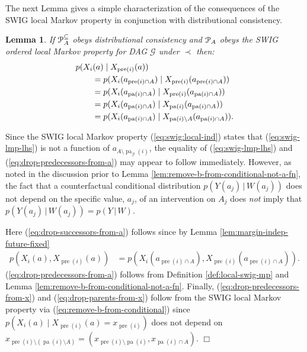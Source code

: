 \documentclass[11pt]{article}
\DeclareMathOperator{\pa}{pa}
\DeclareMathOperator{\pre}{pre}
\newtheorem{lemma}[theorem]{Lemma}
\newcommand{\G}{{\mathscr G}}
\begin{document}
{The next Lemma gives a simple characterization of the consequences of the SWIG local Markov property in conjunction with distributional consistency.

\begin{lemma}\label{lem:kernel-of-swig-lmp}
 If ${\cal P}^{\subseteq}_A$ obeys distributional consistency and ${\cal P}_A$  obeys the 
SWIG ordered local Markov property for DAG $\G$ under $\prec$ then:
\begin{align}
\MoveEqLeft{p(X_i({ a}) \mid X_{\pre(i)}({ a}) )}\label{eq:swig-lmp-lhs}\\
&= p(X_i({ a}_{\pre(i)\cap A}) \mid X_{\pre(i)}({ a}_{\pre(i)\cap A}) ) \label{eq:drop-successors-from-a}  \\
&= p(X_i({ a}_{\pa(i)\cap A}) \mid X_{\pre(i)}({ a}_{\pa(i)\cap A}) ) \label{eq:drop-predecessors-from-a} \\
&= p(X_i({ a}_{\pa(i)\cap A}) \mid X_{\pa(i)}({ a}_{\pa(i)\cap A}) ) \label{eq:drop-predecessors-from-x} \\
&= p(X_i({ a}_{\pa(i)\cap A}) \mid X_{\pa(i)\setminus A}({ a}_{\pa(i)\cap A}) ). \label{eq:drop-parents-from-x} 
\end{align}
\end{lemma}


Since  the SWIG local Markov property (\ref{eq:swig:local-ind}) states that (\ref{eq:swig-lmp-lhs}) is not a function of
$a_{A \setminus \pa_{\G}(i)}$, the
equality of (\ref{eq:swig-lmp-lhs}) and (\ref{eq:drop-predecessors-from-a}) 
may appear to follow immediately.
However, as noted in the discussion prior to Lemma \ref{lem:remove-b-from-conditional-not-a-fn}, the fact that a counterfactual conditional distribution $p(Y(a_j)\,|\,W(a_j))$ does not depend on the specific value, $a_j$, of an intervention on $A_j$ does {\em not} imply that
$p(Y(a_j)\,|\,W(a_j)) = p(Y\,|\,W)$.
\medskip

 Here (\ref{eq:drop-successors-from-a}) follows since by Lemma \ref{lem:margin-indep-future-fixed}
\begin{align*}
p(X_i({ a}), X_{\pre(i)}({ a}) ) 
&= p(X_i({ a}_{\pre(i)\cap A}), X_{\pre(i)}({ a}_{\pre(i)\cap A}) ).
\end{align*}
(\ref{eq:drop-predecessors-from-a}) follows from Definition \ref{def:local-swig-mp} and Lemma \ref{lem:remove-b-from-conditional-not-a-fn}.  Finally, (\ref{eq:drop-predecessors-from-x}) and (\ref{eq:drop-parents-from-x}) follow from the SWIG local Markov property via (\ref{eq:remove-b-from-conditional}) 
since $p(X_i({ a}) \mid X_{\pre(i)}({ a})\!=\! x_{\pre(i)} )$ does not depend on $x_{\pre(i)\setminus (\pa(i) \setminus A)} = 
(x_{\pre(i)\setminus \pa(i)}, x_{\pa(i)\cap A})$.  \hfill$\Box$\par


}
\end{document}
